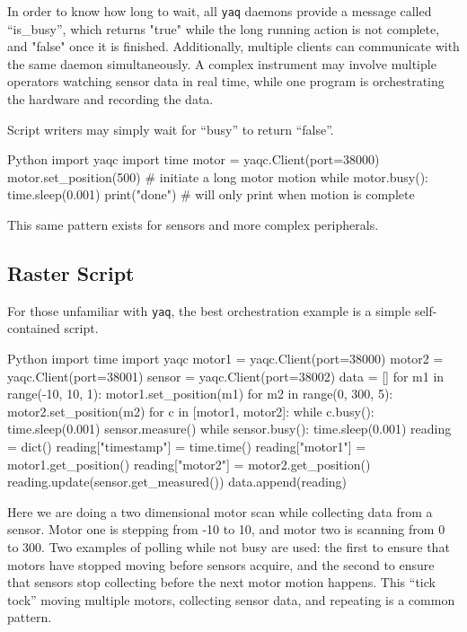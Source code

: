 \documentclass[11pt, full]{article}
\newcommand\yaq{\texttt{yaq}}
\begin{document}
In order to know how long to wait, all \yaq{} daemons provide a message called “is\_busy”, which returns "true" while the long running action is not complete, and "false" once it is finished.
Additionally, multiple clients can communicate with the same daemon simultaneously. A complex instrument may involve multiple operators watching sensor data in real time, while one program is orchestrating the hardware and recording the data.

Script writers may simply wait for ``busy'' to return ``false''.

\begin{codefragment}{Python}
import yaqc
import time
motor = yaqc.Client(port=38000)
motor.set_position(500)  # initiate a long motor motion
while motor.busy():
    time.sleep(0.001)
print("done")  # will only print when motion is complete
\end{codefragment}

This same pattern exists for sensors and more complex peripherals.

\clearpage
\subsection{Raster Script}

For those unfamiliar with \yaq{}, the best orchestration example is a simple self-contained script.

\begin{codefragment}{Python}
import time
import yaqc
motor1 = yaqc.Client(port=38000)
motor2 = yaqc.Client(port=38001)
sensor = yaqc.Client(port=38002)
data = []
for m1 in range(-10, 10, 1):
    motor1.set_position(m1)
    for m2 in range(0, 300, 5):
        motor2.set_position(m2)
        for c in [motor1, motor2]:
            while c.busy():
                time.sleep(0.001)
        sensor.measure()
        while sensor.busy():
            time.sleep(0.001)
        reading = dict()
        reading["timestamp"] = time.time()
        reading["motor1"] = motor1.get_position()
        reading["motor2"] = motor2.get_position()
        reading.update(sensor.get_measured())
        data.append(reading)
\end{codefragment}

Here we are doing a two dimensional motor scan while collecting data from a sensor.
Motor one is stepping from -10 to 10, and motor two is scanning from 0 to 300.
Two examples of polling while not busy are used: the first to ensure that motors have stopped moving before sensors acquire, and the second to ensure that sensors stop collecting before the next motor motion happens.
This ``tick tock'' moving multiple motors, collecting sensor data, and repeating is a common pattern.
\end{document}
